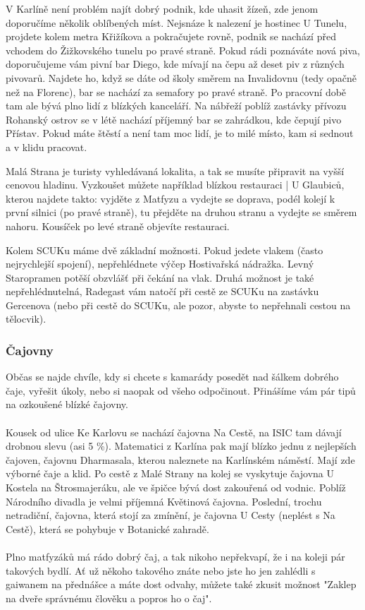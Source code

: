 V Karlíně není problém najít dobrý podnik, kde uhasit žízeň, zde jenom
doporučíme několik oblíbených míst. Nejsnáze k nalezení je hostinec U Tunelu,
projdete kolem metra Křižíkova a pokračujete rovně, podnik se nachází před
vchodem do Žižkovského tunelu po pravé straně. Pokud rádi poznáváte nová piva,
doporučujeme vám pivní bar Diego, kde mívají na čepu až deset piv z různých
pivovarů. Najdete ho, když se dáte od školy směrem na Invalidovnu (tedy opačně
než na Florenc), bar se nachází za semafory po pravé straně. Po pracovní době
tam ale bývá plno lidí z blízkých kanceláří. Na nábřeží poblíž zastávky přívozu
Rohanský ostrov se v létě nachází příjemný bar se zahrádkou, kde čepují pivo
Přístav. Pokud máte štěstí a není tam moc lidí, je to milé místo, kam si sednout
a v klidu pracovat.

Malá Strana je turisty vyhledávaná lokalita, a tak se musíte připravit na vyšší
cenovou hladinu. Vyzkoušet můžete například blízkou restauraci | U Glaubiců,
kterou najdete takto: vyjděte z Matfyzu a vydejte se doprava, podél kolejí k
první silnici (po pravé straně), tu přejděte na druhou stranu a vydejte se
směrem nahoru. Kousíček po levé straně objevíte restauraci.

Kolem SCUKu máme dvě základní možnosti. Pokud jedete vlakem (často nejrychlejší
spojení), nepřehlédnete výčep Hostivařská nádražka. Levný Staropramen potěší
obzvlášť při čekání na vlak. Druhá možnost je také nepřehlédnutelná, Radegast
vám natočí při cestě ze SCUKu na zastávku Gercenova (nebo při cestě do SCUKu,
ale pozor, abyste to nepřehnali cestou na tělocvik).


\subsubsection{Čajovny}
Občas se najde chvíle, kdy si chcete s kamarády posedět nad šálkem dobrého čaje,
vyřešit úkoly, nebo si naopak od všeho odpočinout. Přinášíme vám pár tipů na
ozkoušené blízké čajovny.
\\\\
Kousek od ulice Ke Karlovu se nachází čajovna Na Cestě, na ISIC tam dávají
drobnou slevu (asi 5 \%). Matematici z Karlína pak mají blízko jednu z
nejlepších čajoven, čajovnu Dharmasala, kterou naleznete na Karlínském náměstí.
Mají zde výborné čaje a klid. Po cestě z Malé Strany na kolej se vyskytuje
čajovna U Kostela na Štrosmajeráku, ale ve špičce bývá dost zakouřená od vodnic.
Poblíž Národního divadla je velmi příjemná Květinová čajovna. Poslední, trochu
netradiční, čajovna, která stojí za zmínění, je čajovna U Cesty (neplést s Na
Cestě), která se pohybuje v Botanické zahradě.
\\\\
Plno matfyzáků má rádo dobrý čaj, a tak nikoho nepřekvapí, že i na koleji pár
takových bydlí. Ať už někoho takového znáte nebo jste ho jen zahlédli s gaiwanem
na přednášce a máte dost odvahy, můžete také zkusit možnost "Zaklep na dveře
správnému člověku a popros ho o čaj".


